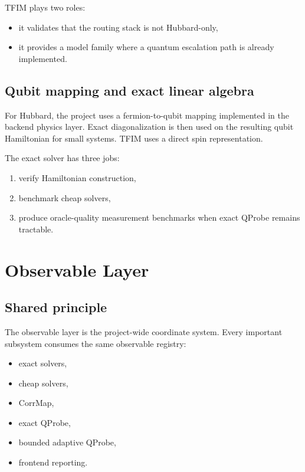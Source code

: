 \documentclass[11pt]{article}
\begin{document}
TFIM plays two roles:

\begin{itemize}
\item it validates that the routing stack is not Hubbard-only,
\item it provides a model family where a quantum escalation path is already implemented.
\end{itemize}

\subsection{Qubit mapping and exact linear algebra}

For Hubbard, the project uses a fermion-to-qubit mapping implemented in the backend physics layer. Exact diagonalization is then used on the resulting qubit Hamiltonian for small systems. TFIM uses a direct spin representation.

The exact solver has three jobs:

\begin{enumerate}[label=\arabic*.]
\item verify Hamiltonian construction,
\item benchmark cheap solvers,
\item produce oracle-quality measurement benchmarks when exact QProbe remains tractable.
\end{enumerate}

\section{Observable Layer}

\subsection{Shared principle}

The observable layer is the project-wide coordinate system. Every important subsystem consumes the same observable registry:

\begin{itemize}
\item exact solvers,
\item cheap solvers,
\item CorrMap,
\item exact QProbe,
\item bounded adaptive QProbe,
\item frontend reporting.
\end{itemize}
\end{document}
